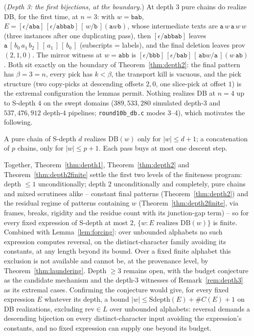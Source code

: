 \begin{remark}
    \label{rem:depth3}
    (\emph{Depth 3: the first bijections, at the boundary.})  At
    depth $3$ pure chains do realize DB, for the first time, at $n =
    3$: with $w = \mathtt{bab}$,
    $E = [\epsilon/\mathtt{aba}]\,[\epsilon/\mathtt{abbab}]\,
    [\,w/\mathtt{b}\,](\mathtt{a}w\mathtt{b})$, whose intermediate
    texts are
    $\mathtt{a}\,w\,\mathtt{a}\,w\,w$ (three instances after one
    duplicating pass), then
    $[\epsilon/\mathtt{abbab}]$ leaves
    $\mathtt{a}\,[\,b_0\,a_1\,b_2\,]\,[\,a_1\,]\,[\,b_0\,]$
    (subscripts = labels), and the final deletion leaves prov
    $(2,1,0)$.  The mirror witness at $w = \mathtt{abb}$ is
    $[\epsilon/\mathtt{bbb}]\,[\epsilon/\mathtt{bab}]\,
    [\,\mathtt{ab}w/\mathtt{a}\,](w\,\mathtt{ab})$.
    Both sit exactly on the boundary of
    Theorem~\ref{thm:depth2}: the final pattern has $\beta = 3 = n$,
    every pick has $k < \beta$, the transport kill is vacuous, and
    the pick structure (two copy-picks at descending offsets $2, 0$,
    one slice-pick at offset $1$) is the extremal configuration the
    lemmas permit.  Nothing realizes DB at $n = 4$ up to
    S-depth $4$ on the swept domains ($389{,}533{,}280$ simulated
    depth-$3$ and $537{,}476{,}912$ depth-$4$ pipelines;
    \texttt{round10b\_db.c} modes 3--4), which motivates the
    following.
\end{remark}

\begin{conjecture}[budget]
    \label{conj:budget}
    A pure chain of S-depth $d$ realizes $\mathrm{DB}(w)$ only for
    $|w| \leq d + 1$; a concatenation of $p$ chains, only for $|w|
    \leq p + 1$.  Each pass buys at most one descent step.
\end{conjecture}

\noindent Together, Theorem~\ref{thm:depth1}, Theorem~\ref{thm:depth2}
and Theorem~\ref{thm:depth2finite} settle the first two levels of the
finiteness program: depth $\leq 1$ unconditionally; depth $2$
unconditionally and completely, pure chains and mixed scrutinees
alike -- constant final patterns (Theorem~\ref{thm:depth2}) and the
residual regime of patterns containing $w$
(Theorem~\ref{thm:depth2finite}, via frames, breaks, rigidity and
the residue count with its junction-gap term) -- so for every fixed
expression of S-depth at most $2$, $\{w : E \text{ realizes }
\mathrm{DB}(w)\}$ is finite.  Combined with
Lemma~\ref{lem:forcing}: over unbounded alphabets no such expression
computes reversal, on the distinct-character family avoiding its
constants, at any length beyond its bound.  Over a fixed finite
alphabet this exclusion is not available and cannot be, at the
provenance level, by Theorem~\ref{thm:laundering}.  Depth $\geq 3$
remains open, with the
budget conjecture as the candidate mechanism and the depth-$3$
witnesses of Remark~\ref{rem:depth3} as its extremal cases.
Confirming the conjecture would give, for every fixed expression $E$
whatever its depth, a bound $|w| \leq \mathrm{Sdepth}(E) + \#C(E) +
1$ on DB realizations, excluding $\mathrm{rev} \in L$ over unbounded
alphabets: reversal demands a descending bijection on every
distinct-character input avoiding the expression's constants, and no
fixed expression can supply one beyond its budget.
